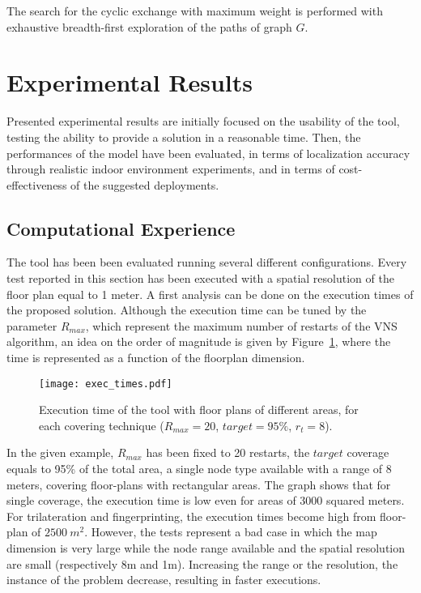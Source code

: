 The search for the cyclic exchange with maximum weight is performed with exhaustive breadth-first exploration of the paths of graph $G$.


\section{Experimental Results}\label{sec:results}
Presented experimental results are initially focused on the usability of the tool, testing the ability to provide a solution in a reasonable time. Then, the performances of the model have been evaluated, in terms of localization accuracy through realistic indoor environment experiments, and in terms of cost-effectiveness of the suggested deployments.

\subsection{Computational Experience}\label{subsec:comp_res}
The tool has been been evaluated running several different configurations. Every test reported in this section has been executed with a spatial resolution of the floor plan equal to 1 meter.  A first analysis can be done on the execution times of the proposed solution. Although the execution time can be tuned by the parameter $R_{max}$, which represent the maximum number of restarts of the VNS algorithm, an idea on the order of magnitude is given by Figure~\ref{fig:time}, where the time is represented as a function of the floorplan dimension. 
\begin{figure}[h!tb]
\centering\texttt{[image: exec\_times.pdf]}
\caption{Execution time of the tool with floor plans of different areas, for each covering technique ($R_{max} = 20$, $target = 95\%$, $r_t=8$).}
\label{fig:time}
\end{figure}
In the given example, $R_{max}$ has been fixed to 20 restarts, the $target$ coverage equals to 95\% of the total area, a single node type available with a range of 8 meters, covering floor-plans with rectangular areas. The graph shows that for single coverage, the execution time is low even for areas of 3000 squared meters. For trilateration and fingerprinting, the execution times become high from floor-plan of $2500~m^2$. However, the tests represent a bad case in which the map dimension is very large while the node range available and the spatial resolution are small (respectively 8m and 1m). Increasing the range or the resolution, the instance of the problem decrease, resulting in faster executions.

